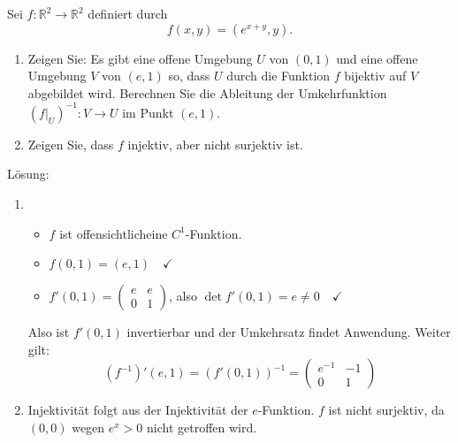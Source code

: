 Sei $f : \mathbb{R}^2 \to \mathbb{R}^2$ definiert durch
\begin{displaymath}
  f(x,y) = (e^{x + y}, y).
\end{displaymath}
\begin{enumerate}
    \item Zeigen Sie:
    Es gibt eine offene Umgebung $U$ von $(0,1)$ und eine offene Umgebung $V$ von $(e,1)$ so, dass $U$ durch die Funktion $f$ bijektiv auf $V$ abgebildet wird.
    Berechnen Sie die Ableitung der Umkehrfunktion $(f|_U)^{-1} : V \to U$ im Punkt $(e,1)$.
    \item Zeigen Sie, dass $f$ injektiv, aber nicht surjektiv ist.
\end{enumerate}
Lösung: 
\begin{enumerate}
    \item
    \begin{itemize}
        \item $f$ ist offensichtlicheine $C^1$-Funktion.
        \item $f(0,1) = (e,1) \quad \checkmark$
        \item $f'(0,1) = \begin{pmatrix} e & e\\ 0 & 1\end{pmatrix}$, also $\det f'(0,1) = e \neq 0 \quad \checkmark$
    \end{itemize}
    Also ist $f'(0,1)$ invertierbar und der Umkehrsatz findet Anwendung.
    Weiter gilt:
    \begin{displaymath}
      (f^{-1})'(e, 1) = (f'(0,1))^{-1} =
      \begin{pmatrix}
        e^{-1} & -1\\
        0 & 1
     \end{pmatrix}
    \end{displaymath}
    \item Injektivität folgt aus der Injektivität der $e$-Funktion.
    $f$ ist nicht surjektiv, da $(0,0)$ wegen $e^x > 0$ nicht getroffen wird.
\end{enumerate}

